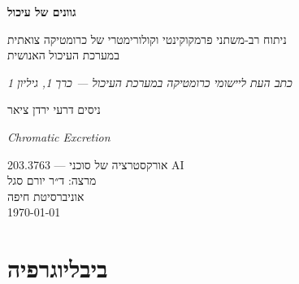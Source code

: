 \documentclass[11pt,a4paper]{article}
\begin{document}
\begin{titlepage}
\centering
\vspace*{2cm}
{\Huge\bfseries גוונים של עיכול\par}
\vspace{0.6cm}
{\large ניתוח רב-משתני פרמקוקינטי וקולורימטרי של כרומטיקה צואתית\\
במערכת העיכול האנושית\par}
\vspace{0.8cm}
{\large\itshape כתב העת ליישומי כרומטיקה במערכת העיכול — כרך 1, גיליון 1\par}
\vspace{1.2cm}
{\large ניסים דרעי \quad\textbullet\quad ירדן ציאר\par}
\vspace{0.6cm}
{\large\englishfont\itshape Chromatic Excretion\par}
\vfill
{203.3763 — אורקסטרציה של סוכני \textenglish{AI}\\
מרצה: ד״ר יורם סגל\\
אוניברסיטת חיפה\\
\today\par}
\end{titlepage}

\tableofcontents
\newpage



\section*{\texthebrew{ביבליוגרפיה}}
\begin{english}
\printbibliography[heading=none]
\end{english}
\end{document}
